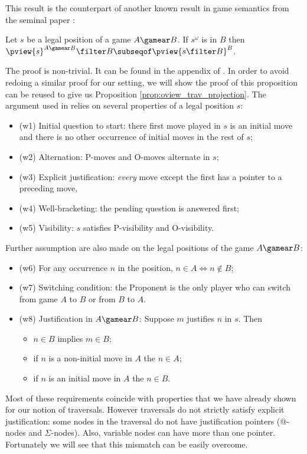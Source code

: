 This result is the counterpart of another known result in game semantics from the seminal paper \cite{hylandong_pcf}:
\begin{proposition}{\cite[Prop.4.3]{hylandong_pcf}}
\label{prop:hylandong_pviewprojection}
  Let $s$ be a legal position of a game $A\gamear B$.
  If $s^\omega$ is in $B$ then $\pview{s}^{A\gamear B} \filter B \subseqof \pview{s\filter B}^B$.
\end{proposition}
The proof is non-trivial. It can be found in the appendix of
\cite{hylandong_pcf}. In order to avoid redoing a similar proof for
our setting, we will show the proof of this proposition can be
reused to give us Proposition \ref{prop:oview_trav_projection}. The
argument used in \cite{hylandong_pcf} relies on several properties
of a legal position $s$:
\begin{itemize}
  \item (w1) Initial question to start: there first move played in $s$ is an initial move and there is no other occurrence of initial moves in the rest of $s$;
  \item(w2) Alternation: P-moves and O-moves alternate in $s$;
  \item(w3)  Explicit justification: \emph{every} move except the first has a pointer to a preceding move,
  \item(w4)  Well-bracketing: the pending question is answered first;
  \item(w5)  Visibility: $s$ satisfies P-visibility and
O-visibility.
\end{itemize}
Further assumption are also made on the legal positions of the game
$A\gamear B$:
\begin{itemize}
  \item(w6) For any occurrence $n$ in the position, $n \in A \iff n \not\in
B$;
  \item(w7) Switching condition: the Proponent is the only player
      who can switch from game $A$ to $B$ or from $B$ to $A$.
  \item(w8) Justification in $A\gamear B$: Suppose $m$ justifies $n$ in $s$. Then
    \begin{itemize}
        \item $n \in B$ implies $m\in B$;
        \item if $n$ is a non-initial move in $A$ the $n \in A$;
        \item if $n$ is an initial move in $A$ the $n \in B$.
    \end{itemize}
\end{itemize}
Most of these requirements coincide with properties that we have
already shown for our notion of traversals. However traversals do
not strictly satisfy explicit justification: some nodes in the
traversal do not have justification pointers (@-nodes and
$\Sigma$-nodes). Also, variable nodes can have more than one
pointer. Fortunately we will see that this mismatch can be easily
overcome.


